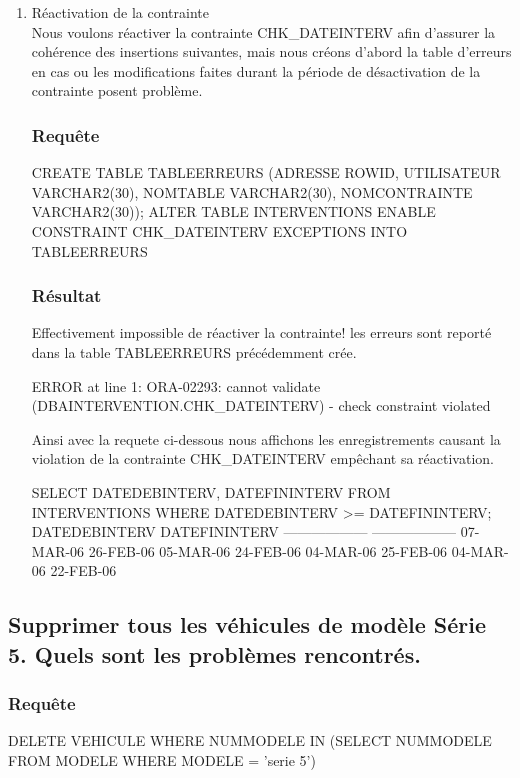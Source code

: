 \documentclass[•]{article}
\begin{document}
\begin{enumerate}
    \item Réactivation de la contrainte
    \\
    Nous voulons réactiver la contrainte CHK\_DATEINTERV afin d'assurer la cohérence des insertions suivantes, mais nous créons d'abord la table d'erreurs en cas ou les modifications faites durant la période de désactivation de la contrainte posent problème.
    \subsubsection{Requête}
    \begin{sql}
    CREATE TABLE TABLEERREURS (ADRESSE ROWID, UTILISATEUR VARCHAR2(30), NOMTABLE VARCHAR2(30), NOMCONTRAINTE VARCHAR2(30));
    ALTER TABLE INTERVENTIONS ENABLE CONSTRAINT CHK_DATEINTERV EXCEPTIONS INTO TABLEERREURS
    \end{sql}
    \subsubsection{Résultat}
    \textrm{Effectivement impossible de réactiver la contrainte! les erreurs sont reporté dans la table TABLEERREURS précédemment crée.}
    \begin{sql}
    ERROR at line 1:
    ORA-02293: cannot validate (DBAINTERVENTION.CHK_DATEINTERV) - check constraint violated     
\end{sql}
Ainsi avec la requete ci-dessous nous affichons les enregistrements causant la violation de la contrainte CHK\_DATEINTERV empêchant sa réactivation.
\begin{sql}
SELECT DATEDEBINTERV, DATEFININTERV FROM INTERVENTIONS WHERE DATEDEBINTERV >= DATEFININTERV;
DATEDEBINTERV      DATEFININTERV
------------------ ------------------
07-MAR-06          26-FEB-06
05-MAR-06          24-FEB-06
04-MAR-06          25-FEB-06
04-MAR-06          22-FEB-06
\end{sql}
\end{enumerate}

\subsection{Supprimer tous les véhicules de modèle Série 5. Quels sont les problèmes rencontrés.}
\subsubsection{Requête}
\begin{sql}
DELETE VEHICULE WHERE NUMMODELE IN (SELECT NUMMODELE FROM MODELE WHERE MODELE = 'serie 5')
\end{sql}
\end{document}
